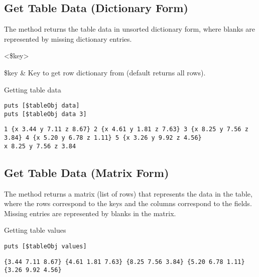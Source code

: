 \subsection{Get Table Data (Dictionary Form)}
The method  returns the table data in unsorted dictionary form, where blanks are represented by missing dictionary entries. 
\begin{syntax}
 <\$key>
\end{syntax}
\begin{args}
\$key & Key to get row dictionary from (default returns all rows).
\end{args}

\begin{example}{Getting table data}
\begin{lstlisting}
puts [$tableObj data]
puts [$tableObj data 3]
\end{lstlisting}
\tcblower
\begin{lstlisting}
1 {x 3.44 y 7.11 z 8.67} 2 {x 4.61 y 1.81 z 7.63} 3 {x 8.25 y 7.56 z 3.84} 4 {x 5.20 y 6.78 z 1.11} 5 {x 3.26 y 9.92 z 4.56}
x 8.25 y 7.56 z 3.84
\end{lstlisting}
\end{example}
\subsection{Get Table Data (Matrix Form)}
The method  returns a matrix (list of rows) that represents the data in the table, where the rows correspond to the keys and the columns correspond to the fields. Missing entries are represented by blanks in the matrix. 
\begin{syntax}
\end{syntax}
\begin{example}{Getting table values}
\begin{lstlisting}
puts [$tableObj values]
\end{lstlisting}
\tcblower
\begin{lstlisting}
{3.44 7.11 8.67} {4.61 1.81 7.63} {8.25 7.56 3.84} {5.20 6.78 1.11} {3.26 9.92 4.56}
\end{lstlisting}
\end{example}
\clearpage
